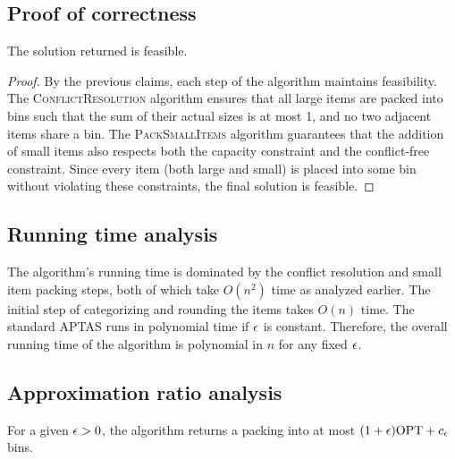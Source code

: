 \subsection*{Proof of correctness}
\begin{claim}
The solution returned is feasible.
\end{claim}

\begin{proof}
By the previous claims, each step of the algorithm maintains feasibility. The \textsc{ConflictResolution} algorithm ensures that all large items are packed into bins such that the sum of their actual sizes is at most 1, and no two adjacent items share a bin. The \textsc{PackSmallItems} algorithm guarantees that the addition of small items also respects both the capacity constraint and the conflict-free constraint. Since every item (both large and small) is placed into some bin without violating these constraints, the final solution is feasible.
\end{proof}

\subsection*{Running time analysis}
The algorithm's running time is dominated by the conflict resolution and small item packing steps, both of which take $O(n^2)$ time as analyzed earlier. The initial step of categorizing and rounding the items takes $O(n)$ time. The standard APTAS runs in polynomial time if $\epsilon$ is constant. Therefore, the overall running time of the algorithm is polynomial in $n$ for any fixed $\epsilon$.

\subsection*{Approximation ratio analysis}
\begin{claim}
For a given $\epsilon > 0$, the algorithm returns a packing into at most $(1 + \epsilon)\text{OPT} + c_\epsilon$ bins.
\end{claim}

